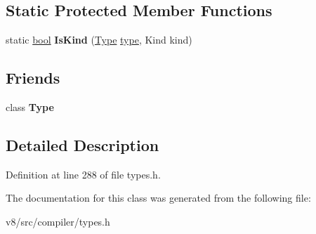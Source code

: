 \subsection*{Static Protected Member Functions}
\begin{DoxyCompactItemize}
\item 
\mbox{\label{classv8_1_1internal_1_1compiler_1_1TypeBase_aa74ef18c7c0a2947a58f7a791b45584e}} 
static \mbox{\hyperlink{classbool}{bool}} {\bfseries Is\+Kind} (\mbox{\hyperlink{classv8_1_1internal_1_1compiler_1_1Type}{Type}} \mbox{\hyperlink{classstd_1_1conditional_1_1type}{type}}, Kind kind)
\end{DoxyCompactItemize}
\subsection*{Friends}
\begin{DoxyCompactItemize}
\item 
\mbox{\label{classv8_1_1internal_1_1compiler_1_1TypeBase_a18dba29b4f3e91d6d2bc53472a6bb7cc}} 
class {\bfseries Type}
\end{DoxyCompactItemize}


\subsection{Detailed Description}


Definition at line 288 of file types.\+h.



The documentation for this class was generated from the following file\+:\begin{DoxyCompactItemize}
\item 
v8/src/compiler/types.\+h\end{DoxyCompactItemize}
